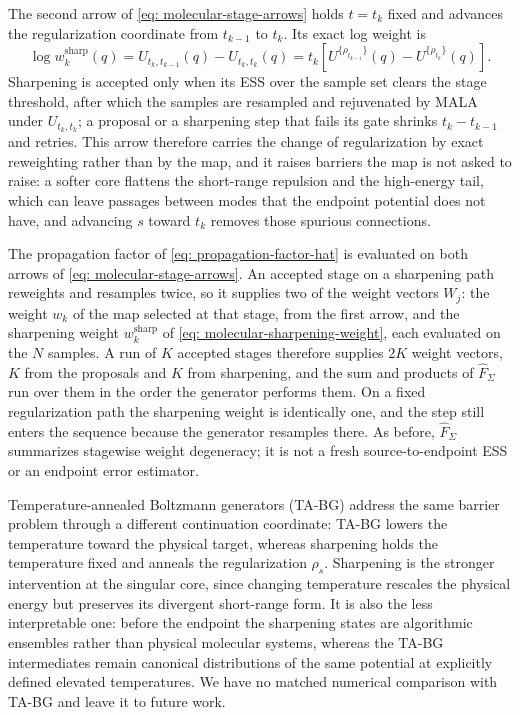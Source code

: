 \documentclass{article}
\begin{document}
The second arrow of \eqref{eq: molecular-stage-arrows} holds $t=t_k$ fixed and advances the regularization coordinate from $t_{k-1}$ to $t_k$. Its exact log weight is
\begin{equation}
\log w_k^{\mathrm{sharp}}(q)
=U_{t_k,t_{k-1}}(q)-U_{t_k,t_k}(q)
=t_k\!\left[U^{\{\rho_{t_{k-1}}\}}(q)
-U^{\{\rho_{t_k}\}}(q)\right].
\label{eq: molecular-sharpening-weight}
\end{equation}
Sharpening is accepted only when its ESS over the sample set clears the stage threshold, after which the samples are resampled and rejuvenated by MALA under $U_{t_k,t_k}$; a proposal or a sharpening step that fails its gate shrinks $t_k-t_{k-1}$ and retries. This arrow therefore carries the change of regularization by exact reweighting rather than by the map, and it raises barriers the map is not asked to raise: a softer core flattens the short-range repulsion and the high-energy tail, which can leave passages between modes that the endpoint potential does not have, and advancing $s$ toward $t_k$ removes those spurious connections.

The propagation factor of \eqref{eq: propagation-factor-hat} is evaluated on both arrows of \eqref{eq: molecular-stage-arrows}. An accepted stage on a sharpening path reweights and resamples twice, so it supplies two of the weight vectors $W_j$: the weight $w_k$ of the map selected at that stage, from the first arrow, and the sharpening weight $w_k^{\mathrm{sharp}}$ of \eqref{eq: molecular-sharpening-weight}, each evaluated on the $N$ samples. A run of $K$ accepted stages therefore supplies $2K$ weight vectors, $K$ from the proposals and $K$ from sharpening, and the sum and products of $\hat F_\Sigma$ run over them in the order the generator performs them. On a fixed regularization path the sharpening weight is identically one, and the step still enters the sequence because the generator resamples there. As before, $\hat F_\Sigma$ summarizes stagewise weight degeneracy; it is not a fresh source-to-endpoint ESS or an endpoint error estimator.

Temperature-annealed Boltzmann generators (TA-BG) \citep{schopmans2025temperature} address the same barrier problem through a different continuation coordinate: TA-BG lowers the temperature toward the physical target, whereas sharpening holds the temperature fixed and anneals the regularization $\rho_s$. Sharpening is the stronger intervention at the singular core, since changing temperature rescales the physical energy but preserves its divergent short-range form. It is also the less interpretable one: before the endpoint the sharpening states are algorithmic ensembles rather than physical molecular systems, whereas the TA-BG intermediates remain canonical distributions of the same potential at explicitly defined elevated temperatures. We have no matched numerical comparison with TA-BG and leave it to future work.
\end{document}
